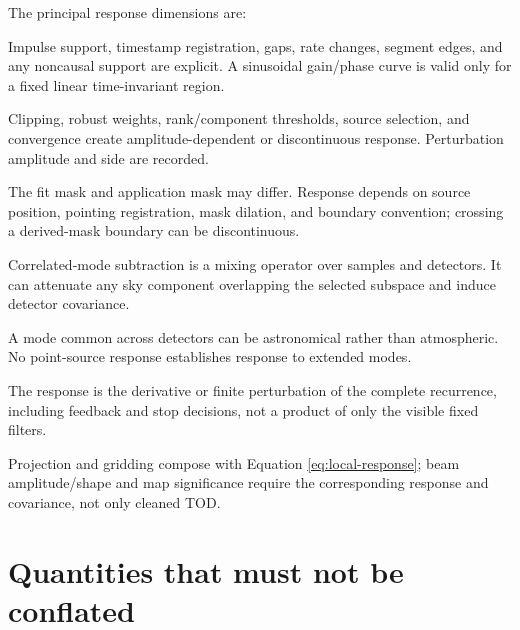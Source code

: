\documentclass[11pt]{article}
\begin{document}
The principal response dimensions are:
\begin{description}[leftmargin=0.22\linewidth,style=nextline]
  \item[Temporal and phase.] Impulse support, timestamp registration, gaps,
  rate changes, segment edges, and any noncausal support are explicit.  A
  sinusoidal gain/phase curve is valid only for a fixed linear time-invariant
  region.
  \item[Amplitude.] Clipping, robust weights, rank/component thresholds,
  source selection, and convergence create amplitude-dependent or
  discontinuous response.  Perturbation amplitude and side are recorded.
  \item[Spatial/source mask.] The fit mask and application mask may differ.
  Response depends on source position, pointing registration, mask dilation,
  and boundary convention; crossing a derived-mask boundary can be
  discontinuous.
  \item[Common/PCA and detector.] Correlated-mode subtraction is a mixing
  operator over samples and detectors.  It can attenuate any sky component
  overlapping the selected subspace and induce detector covariance.
  \item[Extended emission.] A mode common across detectors can be astronomical
  rather than atmospheric.  No point-source response establishes response to
  extended modes.
  \item[Iteration/pass.] The response is the derivative or finite perturbation
  of the complete recurrence, including feedback and stop decisions, not a
  product of only the visible fixed filters.
  \item[Map/beam.] Projection and gridding compose with Equation
  \eqref{eq:local-response}; beam amplitude/shape and map significance require
  the corresponding response and covariance, not only cleaned TOD.
\end{description}

\section{Quantities that must not be conflated}
\label{sec:distinctions}
\end{document}
